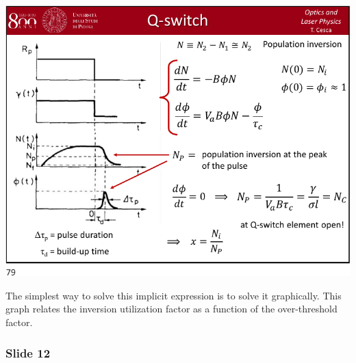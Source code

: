 \documentclass[../main/main.tex]{subfiles}
\begin{document}
\begin{minipage}[]{0.5\linewidth}
\centering
\includegraphics[page=11,width=1\textwidth]{../lessons/pdf_file/15_lecture.pdf}
\end{minipage}
\hspace{0.3cm}\vspace{0.3cm}
\begin{minipage}[c]{0.47\linewidth}

The simplest way to solve this implicit expression is to solve it graphically. This graph relates the inversion utilization factor as a function of the over-threshold factor.

\end{minipage}

\subsubsection*{Slide 12}
\end{document}
